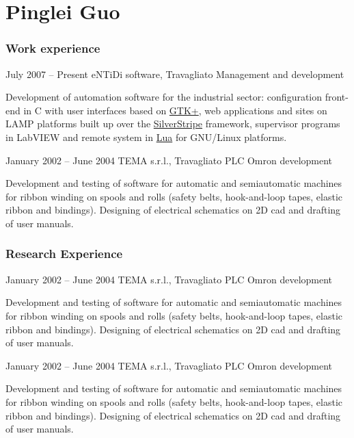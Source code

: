 \documentclass[fontsize=10pt]{tccv}
\begin{document}
\part{Pinglei Guo}

\section{Work experience}

\begin{eventlist}


\item{July 2007 -- Present}
     {eNTiDi software, Travagliato}
     {Management and development}

Development of automation software for the industrial sector:
configuration front-end in C with user interfaces based on
\href{http://www.gtk.org/}{GTK+}, web applications and sites
on LAMP platforms built up over the
\href{http://www.silverstripe.org/}{SilverStripe} framework,
supervisor programs in LabVIEW and remote system in
\href{http://www.lua.org/}{Lua} for GNU/Linux platforms.

\item{January 2002 -- June 2004}
     {TEMA s.r.l., Travagliato}
     {PLC Omron development}

Development and testing of software for automatic and semiautomatic
machines for ribbon winding on spools and rolls (safety belts,
hook-and-loop tapes, elastic ribbon and bindings). Designing of
electrical schematics on 2D cad and drafting of user manuals.

\end{eventlist}

\section{Research Experience}

\begin{eventlist}

\item{January 2002 -- June 2004}
     {TEMA s.r.l., Travagliato}
     {PLC Omron development}

Development and testing of software for automatic and semiautomatic
machines for ribbon winding on spools and rolls (safety belts,
hook-and-loop tapes, elastic ribbon and bindings). Designing of
electrical schematics on 2D cad and drafting of user manuals.

\item{January 2002 -- June 2004}
     {TEMA s.r.l., Travagliato}
     {PLC Omron development}

Development and testing of software for automatic and semiautomatic
machines for ribbon winding on spools and rolls (safety belts,
hook-and-loop tapes, elastic ribbon and bindings). Designing of
electrical schematics on 2D cad and drafting of user manuals.

\end{eventlist}
\end{document}
